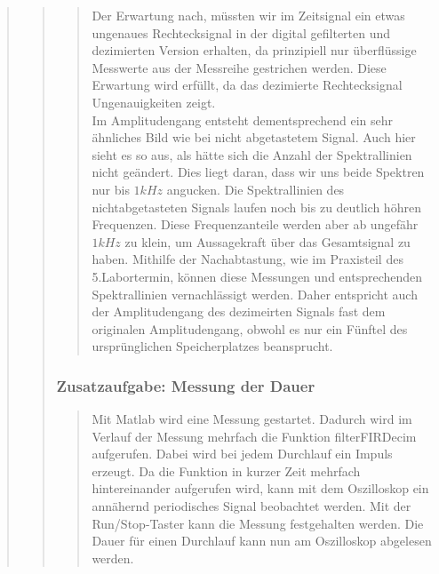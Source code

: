 \begin{quote}
\begin{quote}
\begin{quote}
        	\vspace{1.5em}
        	
        	Der Erwartung nach, müssten wir im Zeitsignal ein etwas ungenaues
        	Rechtecksignal in der digital gefilterten und dezimierten
        	Version erhalten, da prinzipiell nur überflüssige Messwerte aus der
        	Messreihe gestrichen werden. Diese Erwartung wird erfüllt, da das
        	dezimierte Rechtecksignal Ungenauigkeiten zeigt.\\
        	Im Amplitudengang entsteht dementsprechend ein sehr ähnliches Bild wie
        	bei nicht abgetastetem Signal. Auch hier sieht es so aus, als hätte
        	sich die Anzahl der Spektrallinien nicht geändert. Dies liegt daran,
        	dass wir uns beide Spektren nur bis $1kHz$ angucken. Die Spektrallinien
        	des nichtabgetasteten Signals laufen noch bis zu deutlich höhren
        	Frequenzen. Diese Frequenzanteile werden aber ab ungefähr $1kHz$ zu
        	klein, um Aussagekraft über das Gesamtsignal zu haben. Mithilfe der
        	Nachabtastung, wie im Praxisteil des 5.Labortermin, können diese
        	Messungen und entsprechenden Spektrallinien vernachlässigt werden.
        	Daher entspricht auch der Amplitudengang des dezimeirten Signals fast
        	dem originalen Amplitudengang, obwohl es nur ein Fünftel des
        	ursprünglichen Speicherplatzes beansprucht.
        	
        	\end{quote}
        
        
        \subsubsection{Zusatzaufgabe: Messung der Dauer}
		\begin{quote}
			Mit Matlab wird eine Messung gestartet. Dadurch wird im Verlauf der Messung mehrfach die 
            Funktion filterFIRDecim aufgerufen. Dabei wird bei jedem Durchlauf
            ein Impuls erzeugt. Da die Funktion in kurzer Zeit mehrfach hintereinander aufgerufen wird, 
            kann mit dem Oszilloskop ein annähernd periodisches Signal
            beobachtet werden. Mit der Run/Stop-Taster kann die Messung festgehalten werden. 
            Die Dauer für einen Durchlauf kann nun am Oszilloskop abgelesen
            werden.\\
        

\end{quote}
\end{quote}
\end{quote}
